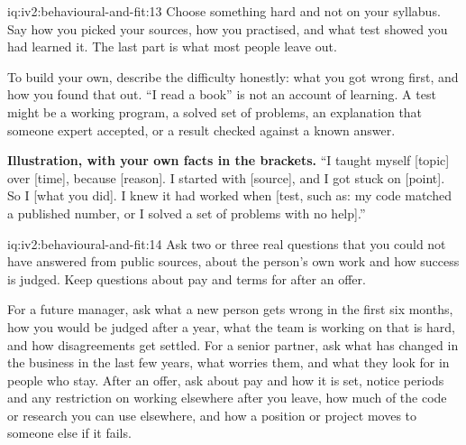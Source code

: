 \begin{solution}{iq:iv2:behavioural-and-fit:13}
Choose something hard and not on your syllabus. Say how you picked your sources, how you practised, and what test showed you had learned it. The last part is what most people leave out.

To build your own, describe the difficulty honestly: what you got wrong first, and how you found that out. ``I read a book'' is not an account of learning. A test might be a working program, a solved set of problems, an explanation that someone expert accepted, or a result checked against a known answer.

\textbf{Illustration, with your own facts in the brackets.} ``I taught myself [topic] over [time], because [reason]. I started with [source], and I got stuck on [point]. So I [what you did]. I knew it had worked when [test, such as: my code matched a published number, or I solved a set of problems with no help].''

\end{solution}

\begin{solution}{iq:iv2:behavioural-and-fit:14}
Ask two or three real questions that you could not have answered from public sources, about the person's own work and how success is judged. Keep questions about pay and terms for after an offer.

For a future manager, ask what a new person gets wrong in the first six months, how you would be judged after a year, what the team is working on that is hard, and how disagreements get settled. For a senior partner, ask what has changed in the business in the last few years, what worries them, and what they look for in people who stay. After an offer, ask about pay and how it is set, notice periods and any restriction on working elsewhere after you leave, how much of the code or research you can use elsewhere, and how a position or project moves to someone else if it fails.

\end{solution}

